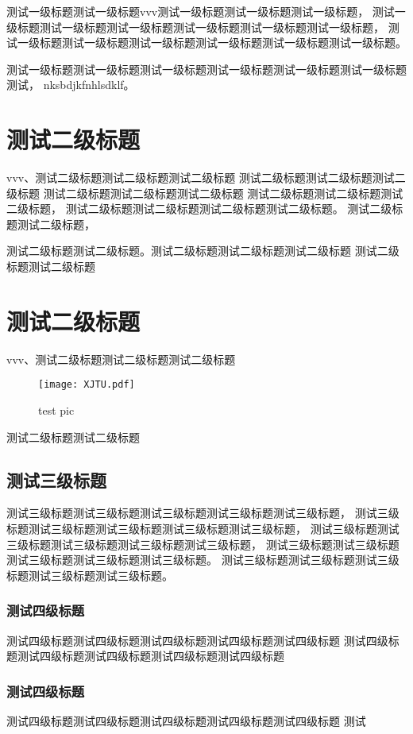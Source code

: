    测试一级标题测试一级标题vvv测试一级标题测试一级标题测试一级标题，
    测试一级标题测试一级标题测试一级标题测试一级标题测试一级标题测试一级标题，
    测试一级标题测试一级标题测试一级标题测试一级标题测试一级标题测试一级标题。

    测试一级标题测试一级标题测试一级标题测试一级标题测试一级标题测试一级标题测试，
    nksbdjkfnhlsdklf。
    \section{测试二级标题}
        vvv、测试二级标题测试二级标题测试二级标题
        测试二级标题测试二级标题测试二级标题
        测试二级标题测试二级标题测试二级标题
        测试二级标题测试二级标题测试二级标题，
        测试二级标题测试二级标题测试二级标题测试二级标题。
        测试二级标题测试二级标题，

        测试二级标题测试二级标题。测试二级标题测试二级标题测试二级标题
        测试二级标题测试二级标题
    \section{测试二级标题}
        vvv、测试二级标题测试二级标题测试二级标题

        \begin{figure}[h!]
            \texttt{[image: XJTU.pdf]}
            \caption{\small test pic}
        \end{figure}

        测试二级标题测试二级标题
        \subsection{测试三级标题}
            测试三级标题测试三级标题测试三级标题测试三级标题测试三级标题，
            测试三级标题测试三级标题测试三级标题测试三级标题测试三级标题，
            测试三级标题测试三级标题测试三级标题测试三级标题测试三级标题，
            测试三级标题测试三级标题测试三级标题测试三级标题测试三级标题。
            测试三级标题测试三级标题测试三级标题测试三级标题测试三级标题。
                \subsubsection{测试四级标题}
                    测试四级标题测试四级标题测试四级标题测试四级标题测试四级标题
                    测试四级标题测试四级标题测试四级标题测试四级标题测试四级标题
                \subsubsection{测试四级标题}
                    测试四级标题测试四级标题测试四级标题测试四级标题测试四级标题
                    测试
